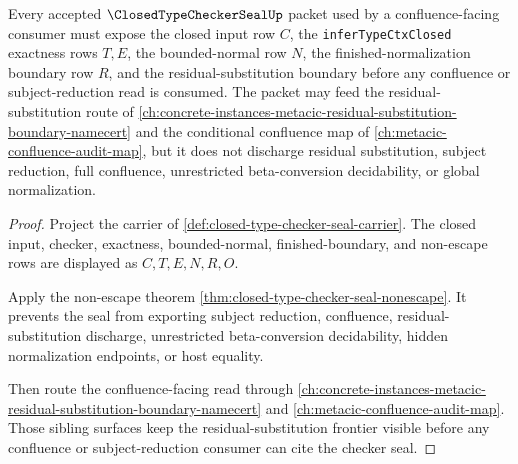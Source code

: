 \begin{theorem}
\label{thm:closed-type-checker-seal-substitution-frontier-handoff}
Every accepted $\ClosedTypeCheckerSealUp$ packet used by a confluence-facing consumer must expose the closed input row $C$, the \texttt{inferTypeCtxClosed} exactness rows $T,E$, the bounded-normal row $N$, the finished-normalization boundary row $R$, and the residual-substitution boundary before any confluence or subject-reduction read is consumed. The packet may feed the residual-substitution route of \autoref{ch:concrete-instances-metacic-residual-substitution-boundary-namecert} and the conditional confluence map of \autoref{ch:metacic-confluence-audit-map}, but it does not discharge residual substitution, subject reduction, full confluence, unrestricted beta-conversion decidability, or global normalization.
\end{theorem}
\begin{proof}
Project the carrier of \autoref{def:closed-type-checker-seal-carrier}. The closed input, checker, exactness, bounded-normal, finished-boundary, and non-escape rows are displayed as $C,T,E,N,R,O$.

Apply the non-escape theorem \autoref{thm:closed-type-checker-seal-nonescape}. It prevents the seal from exporting subject reduction, confluence, residual-substitution discharge, unrestricted beta-conversion decidability, hidden normalization endpoints, or host equality.

Then route the confluence-facing read through \autoref{ch:concrete-instances-metacic-residual-substitution-boundary-namecert} and \autoref{ch:metacic-confluence-audit-map}. Those sibling surfaces keep the residual-substitution frontier visible before any confluence or subject-reduction consumer can cite the checker seal.
\end{proof}



